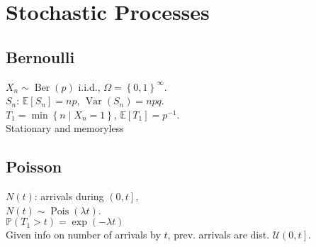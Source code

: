 \section{Stochastic Processes}
	\subsection*{Bernoulli}
	$X_{n}\sim\operatorname{Ber}\left(p\right)$ i.i.d., $\Omega = \left\{0, 1\right\}^{\infty}$.\\
	$S_{n}$: $\mathbb{E}\left[S_{n}\right] = np$, $\operatorname{Var}\left(S_{n}\right) = npq$.\\
	$T_{1} = \min\left\{n\mid X_{n} = 1\right\}$, $\mathbb{E}\left[T_{1}\right] = p^{-1}$.\\
	Stationary and memoryless
	
	\subsection*{Poisson}
	$N\left(t\right)$: arrivals during $\left(0, t\right]$,\\
	$N\left(t\right)\sim\operatorname{Pois}\left(\lambda t\right)$.\\
	$\mathbb{P}\left(T_{1} > t\right) = \exp\left(-\lambda t\right)$\\
	Given info on number of arrivals by $t$, prev. arrivals are dist. $\mathcal{U}\left(0, t\right]$.
